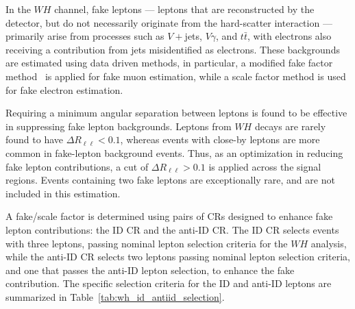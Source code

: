 In the $WH$ channel, fake leptons --- leptons that are reconstructed by the detector, but do not necessarily originate from the hard-scatter interaction --- primarily arise from processes such as $V+$jets, $V\gamma$, and $t\bar{t}$, with electrons also receiving a contribution from jets misidentified as electrons. These backgrounds are estimated using data driven methods, in particular, a modified fake factor method~\cite{ATLAS:2019cbr} is applied for fake muon estimation, while a scale factor method is used for fake electron estimation. 

Requiring a minimum angular separation between leptons is found to be effective in suppressing fake lepton backgrounds. Leptons from $WH$ decays are rarely found to have $\Delta{R}_{\ell\ell} < 0.1$, whereas events with close-by leptons are more common in fake-lepton background events. Thus, as an optimization in reducing fake lepton contributions, a cut of $\Delta{R}_{\ell\ell} > 0.1$ is applied across the signal regions. Events containing two fake leptons are exceptionally rare, and are not included in this estimation.

A fake/scale factor is determined using pairs of CRs designed to enhance fake lepton contributions: the ID CR and the anti-ID CR\@. The ID CR selects events with three leptons, passing nominal lepton selection criteria for the $WH$ analysis, while the anti-ID CR selects two leptons passing nominal lepton selection criteria, and one that passes the anti-ID lepton selection, to enhance the fake contribution. The specific selection criteria for the ID and anti-ID leptons are summarized in Table~\ref{tab:wh_id_antiid_selection}.

